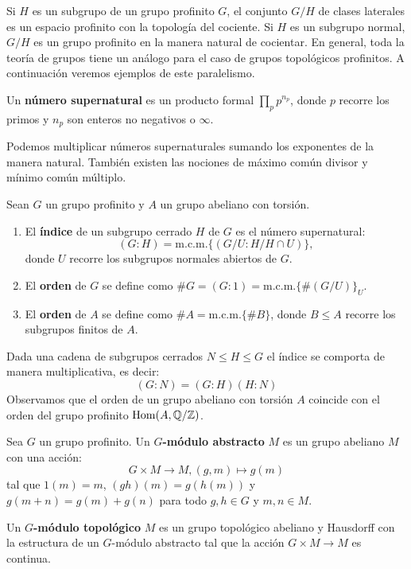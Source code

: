 \documentclass[a4paper,12pt, leqno]{report}
\begin{document}
Si $H$ es un subgrupo de un grupo profinito $G$, el conjunto $G/H$ de clases laterales es un espacio profinito con la topología del cociente. Si $H$ es un subgrupo normal, $G/H$ es un grupo profinito en la manera natural de cocientar. En general, toda la teoría de grupos tiene un análogo para el caso de grupos topológicos profinitos. A continuación veremos ejemplos de este paralelismo.
\begin{definicion}
	Un \textbf{número supernatural} es un producto formal $\prod\limits_{p}p^{n_p}$, donde $p$ recorre los primos y $n_p$ son enteros no negativos o $\infty$.
\end{definicion}
Podemos multiplicar números supernaturales sumando los exponentes de la manera natural. También existen las nociones de máximo común divisor y mínimo común múltiplo. 
\begin{definicion}
	Sean $G$ un grupo profinito y $A$ un  grupo abeliano con torsión. 
	\begin{enumerate}[label=\roman*)]
		\item El \textbf{índice} de un subgrupo cerrado $H$ de $G$ es el número supernatural:
		\begin{equation*}
		(G:H)=\mathrm{m.c.m.}\{(G/U:H/H\cap U)\},
		\end{equation*}
		donde $U$ recorre los subgrupos normales abiertos de $G$. 
		\item  El \textbf{orden} de $G$ se define como $\#G=(G:1)=\mathrm{m.c.m.}\{\#(G/U)\}_U$. 
		\item El \textbf{orden} de $A$ se define como $\#A=\mathrm{m.c.m.} \{\#B\}$, donde $B\leq A$ recorre los subgrupos finitos de $A$.
	\end{enumerate}
\end{definicion}
Dada una cadena de subgrupos cerrados $N\leq H \leq G$ el índice se comporta de manera multiplicativa, es decir:
\begin{equation*}
(G:N)=(G:H)(H:N)
\end{equation*}
Observamos que el orden de un grupo abeliano con torsión $A$ coincide con el orden del grupo profinito $ \mathrm{Hom} (A, \mathbb{Q} / \mathbb{Z})$.
\begin{definicion}
	Sea $G$ un grupo profinito. Un \textbf{$G$-módulo abstracto} $M$ es un grupo abeliano $M$ con una acción:
	\begin{equation*}
	G \times M \rightarrow M, (g,m)\mapsto g(m)
	\end{equation*}
	tal que $1(m)=m$, $(gh)(m)=g(h(m))$ y $g(m+n)=g(m)+g(n)$ para todo $g,h \in G$ y $m,n \in M$.
	
		Un \textbf{$G$-módulo topológico} $M$ es un grupo topológico abeliano y Hausdorff con la estructura de un $G$-módulo abstracto tal que la acción $G \times M \rightarrow M$ es continua. 
\end{definicion}
\end{document}
